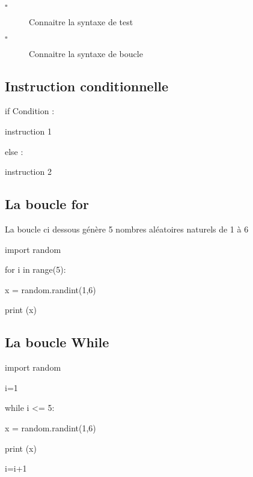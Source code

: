 \begin{titre}[Probabilités]

\end{titre}


\begin{CpsCol}
\begin{description}
\item[$\square$] Connaitre la syntaxe de test
\item[$\square$] Connaitre la syntaxe de boucle
\end{description}
\end{CpsCol}

\subsection*{Instruction conditionnelle}

\color{orange} if \color{black}  Condition :

\hspace{0.4cm}    instruction 1
    
\color{orange} else \color{black} :

\hspace{0.4cm}     instruction 2

\subsection*{La boucle for}

La boucle ci dessous génère 5 nombres aléatoires naturels de 1 à 6

\color{orange} import \color{black} random

\color{orange} for \color{black} i \color{orange} in \color{purple}range\color{black}(5):

\hspace{0.4cm}     x = random.randint(1,6)
 
\hspace{0.4cm}   \color{purple} print \color{black}(x)

\subsection*{La boucle While}
\color{orange} import \color{black} random

i=1

\color{orange}  while \color{black} i <= 5:

\hspace{0.4cm}    x = random.randint(1,6)
    
\hspace{0.4cm}   \color{purple} print \color{black}   (x)
   
\hspace{0.4cm} \color{black}     i=i+1